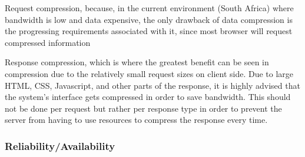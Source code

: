 \documentclass{article}
\begin{document}
\begin{enumerate}
				Request compression, because, in the current environment (South Africa) where bandwidth is low and data expensive, the only drawback of data compression is the progressing requirements associated with it, since most browser will request compressed information

				Response compression, which is where the greatest benefit can be seen in compression due to the relatively small request sizes on client side. Due to large HTML, CSS, Javascript, and other parts of the response, it is highly advised that the system's interface gets compressed in order to save bandwidth. This should not be done per request but rather per response type in order to prevent the server from having to use resources to compress the response every time.

			\end{enumerate}

		\subsubsection{Reliability/Availability}
\end{document}
